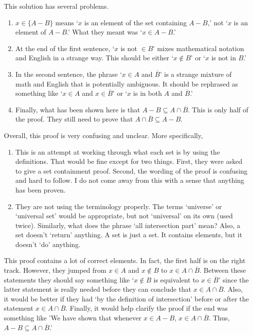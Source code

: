 \begin{eval}
\begin{spfenum}
\noindent
\evallinethree
\end{spfenum}
\begin{answer}
\begin{pfevalenum}
\item
This solution has several problems.
\begin{enumerate}
\item
$x\in \{A-B\}$ means `$x$ is an element of the set containing $A-B$,' not
`$x$ is an element of $A-B$.'  What they meant was `$x\in A-B$.'
\item
At the end of the first sentence, `$x$ is not $\in B$' mixes mathematical
notation and English in a strange way.  
This should be either `$x\not\in B$' or `$x$ is not in $B$.'
\item
In the second sentence, 
the phrase  `$x\in A$ and $\overline{B}$' is a strange mixture of math and English 
that is potentially ambiguous.  It should be rephrased as something like 
`$x\in A$ and $x\in\overline{B}$' or `$x$ is in both $A$ and $\overline{B}$.'
\item
Finally, what has been shown here is that $A-B\subseteq A\cap\overline{B}$.
This is only half of the proof.  They still need to prove that 
$A\cap\overline{B}\subseteq A-B$.
\end{enumerate}
\item 
Overall, this proof is very confusing and unclear.  More specifically,
\begin{enumerate}
\item
This is an attempt at working through what each set is by using the definitions.  
That would be fine except for two things.  
First, they were asked to give a set containment proof. 
Second, the wording of the proof is confusing and hard to follow. 
I do not come away from this with a sense that anything has been proven. 
\item
They are not using the terminology properly. The terms `universe' or `universal set' would be appropriate, but not `universal' on its own (used twice).  Similarly, what does the phrase
`all intersection part' mean?
Also, a set doesn't `return' anything.  A set is just a set. It contains elements, but
it doesn't `do' anything.
\end{enumerate}
\item
This proof contains a lot of correct elements.  In fact, the first half is on the right track.
However, they jumped from $x\in A$ and $x\not\in B$ to $x\in A\cap\overline{B}$.  Between
these statements they should say something like  
`$x\not\in B$ is equivalent to $x\in\overline{B}$' since the latter statement is really needed
before they can conclude that $x\in A\cap\overline{B}$.
Also, it would be better if they had `by the definition of intersection' 
before or after the statement $x\in A\cap\overline{B}$.
Finally, it would help clarify the proof if the end was something like 
'We have shown that whenever $x\in A-B$, $x\in A\cap\overline{B}$.  Thus, $A-B\subseteq A\cap\overline{B}$.'


\end{pfevalenum}
\end{answer}
\end{eval}
